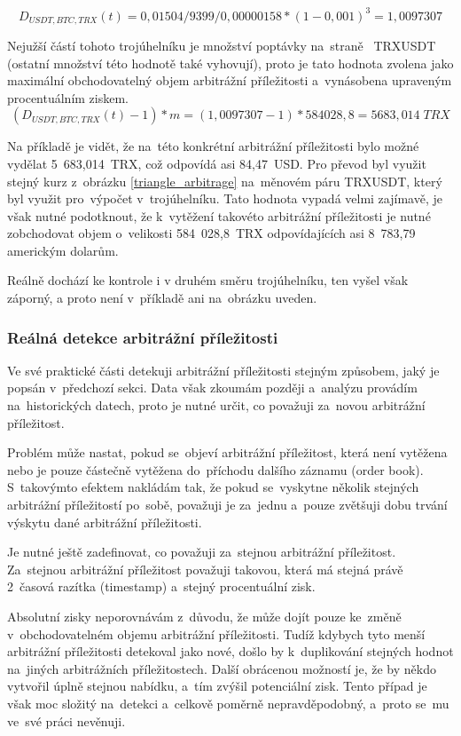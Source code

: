 \documentclass[thesis=B,czech]{FITthesis}[2019/03/21]
\begin{document}
\[D_{USDT,BTC,TRX}(t) = 0,01504 / 9399 / 0,00000158 * (1 - 0,001)^3 = 1,0097307 \]

Nejužší částí tohoto trojúhelníku je množství poptávky na~straně \linebreak~TRXUSDT (ostatní množství této hodnotě také vyhovují), proto je tato hodnota zvolena jako maximální obchodovatelný objem arbitrážní příležitosti a~vynásobena upraveným procentuálním ziskem. 
\[(D_{USDT,BTC,TRX}(t) - 1) * m = (1,0097307 - 1) * 584028,8 = 5683,014\;TRX\]

Na příkladě je vidět, že na~této konkrétní arbitrážní příležitosti bylo možné vydělat 5~683,014~TRX, což odpovídá asi 84,47~USD. Pro převod byl využit stejný kurz z~obrázku \ref{triangle_arbitrage} na~měnovém páru TRXUSDT, který byl využit pro~výpočet v~trojúhelníku.  Tato hodnota vypadá velmi zajímavě, je však nutné podotknout, že k~vytěžení takovéto arbitrážní příležitosti je nutné zobchodovat objem o~velikosti 584~028,8~TRX odpovídajících asi 8~783,79 americkým dolarům. 

Reálně dochází ke kontrole i v druhém směru trojúhelníku, ten vyšel však záporný, a proto není v~příkladě ani na~obrázku uveden.

\subsubsection{Reálná detekce arbitrážní příležitosti}
Ve své praktické části detekuji arbitrážní příležitosti stejným způsobem, jaký je popsán v~předchozí sekci. Data však zkoumám později a~analýzu provádím na~historických datech, proto je nutné určit, co považuji za~novou arbitrážní příležitost.

Problém může nastat, pokud se~objeví arbitrážní příležitost, která není vytěžena nebo je pouze částečně vytěžena do~příchodu dalšího záznamu (order book). S~takovýmto efektem nakládám tak, že pokud se~vyskytne několik stejných arbitrážní příležitostí po~sobě, považuji je za~jednu a~pouze zvětšuji dobu trvání výskytu dané arbitrážní příležitosti.

Je nutné ještě zadefinovat, co považuji za~stejnou arbitrážní příležitost. Za~stejnou arbitrážní příležitost považuji takovou, která má stejná právě 2~časová razítka (timestamp) a~stejný procentuální zisk. 

Absolutní zisky neporovnávám z~důvodu, že může dojít pouze ke~změně v~obchodovatelném objemu arbitrážní příležitosti. Tudíž kdybych tyto menší arbitrážní příležitosti detekoval jako nové, došlo by k~duplikování stejných hodnot na~jiných arbitrážních příležitostech. Další obrácenou možností je, že by někdo vytvořil úplně stejnou nabídku, a~tím zvýšil potenciální zisk. Tento případ je však moc složitý na~detekci a~celkově poměrně nepravděpodobný, a~proto se~mu ve~své práci nevěnuji. 
\end{document}
